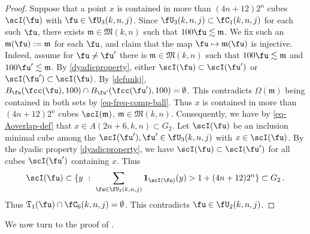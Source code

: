 \begin{proof}
    \leanok
    Suppose that a point $x$ is contained in more than $(4n + 12)2^n$ cubes $\scI(\fu)$ with $\fu \in \fU_3(k,n,j)$.
    Since $\fU_3(k,n,j) \subset \fC_1(k,n,j)$ for each such $\fu$,
    there exists $\mathfrak{m} \in \mathfrak{M}(k,n)$ such that $100\fu \lesssim \mathfrak{m}$.
    We fix such an $\mathfrak{m}(\fu) := \mathfrak{m}$ for each $\fu$, and claim that the map $\fu \mapsto\mathfrak{m}(\fu)$ is injective.
    Indeed, assume for $\fu\neq \fu'$ there is $\mathfrak{m} \in \mathfrak{M}(k,n)$ such that
    $100\fu \lesssim \mathfrak{m}$ and $100\fu' \lesssim \mathfrak{m}$. By \eqref{dyadicproperty},
    either $\scI(\fu) \subset \scI(\fu')$ or $\scI(\fu') \subset \scI(\fu)$.
    By \eqref{defunkj}, $B_{\fu}(\fcc(\fu),100) \cap B_{\fu'}(\fcc(\fu'), 100) = \emptyset$.
    This contradicts $\Omega(\mathfrak{m})$ being contained in both sets by \eqref{eq-freq-comp-ball}.
    Thus $x$ is contained in more than $(4n + 12)2^n$ cubes $\scI(\mathfrak{m})$, $\mathfrak{m} \in \mathfrak{M}(k,n)$.
    Consequently, we have by \eqref{eq-Aoverlap-def} that $x \in A(2n + 6, k,n) \subset G_2$.
    Let $\scI(\fu)$ be an inclusion minimal cube among the $\scI(\fu'), \fu' \in \fU_3(k,n,j)$ with $x \in \scI(\fu)$.
    By the dyadic property \eqref{dyadicproperty}, we have $\scI(\fu) \subset \scI(\fu')$ for all cubes $\scI(\fu')$ containing $x$. Thus
    $$
        \scI(\fu) \subset \{y \ : \ \sum_{\fu \in \fU_3(k,n,j)} \mathbf{1}_{\scI(\fu)}(y) > 1 + (4n+12)2^{n}\} \subset G_2\,.
    $$
    Thus $\mathfrak{T}_1(\fu) \cap \fC_6(k,n,j) = \emptyset$.
    This contradicts $\fu \in \fU_2(k,n,j)$.
\end{proof}
We now turn to the proof of .
